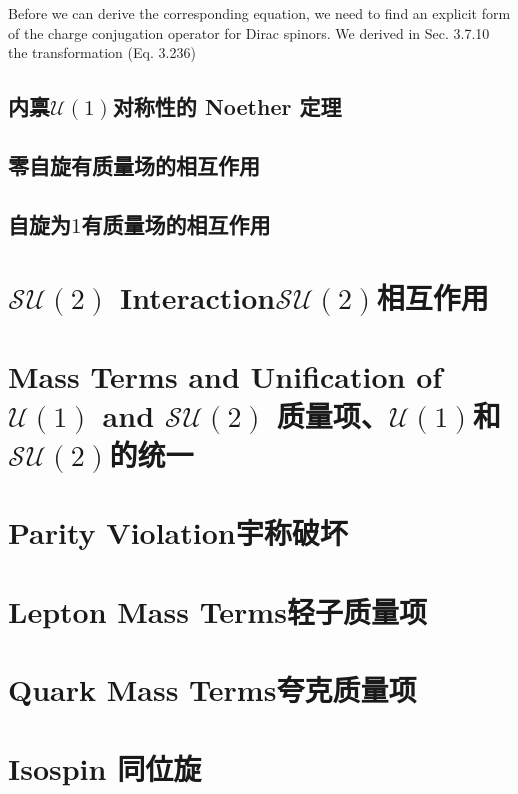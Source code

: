 Before we can derive the corresponding equation, we need to find an
explicit form of the charge conjugation operator for Dirac spinors. We
derived in Sec. 3.7.10 the transformation (Eq. 3.236)
\subsection{内禀${\mathcal U}(1)$对称性的 Noether 定理}\label{sec7.1.6}

\subsection{零自旋有质量场的相互作用}\label{sec7.1.7}

\subsection{自旋为$1$有质量场的相互作用}\label{sec7.1.8}

\section[$\mathcal{SU}(2)$相互作用]{$\mathcal{SU}(2)$ Interaction\quad $\mathcal{SU}(2)$相互作用}\label{sec7.2}

\section[质量项、${\mathcal U}(1)$和$\mathcal{SU}(2)$的统一]{Mass Terms and Unification of ${\mathcal U}(1)$ and $\mathcal{SU}(2)$ \quad 质量项、${\mathcal U}(1)$和$\mathcal{SU}(2)$的统一}\label{sec7.3}

\section[宇称破坏]{Parity Violation\quad 宇称破坏}\label{sec7.4}

\section[轻子质量项]{Lepton Mass Terms\quad 轻子质量项}\label{sec7.5}

\section[夸克质量项]{Quark Mass Terms\quad 夸克质量项}\label{sec7.6}

\section[同位旋]{Isospin \quad 同位旋}\label{sec7.7}

